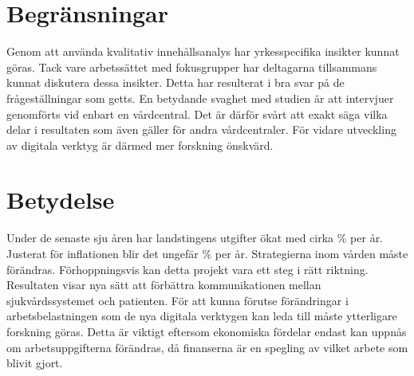 \documentclass[12pt,a4paper,oneside]{article}
\let\oldcite\cite
\renewcommand*\cite[1]{\textsuperscript{\oldcite{#1}}}
\begin{document}
\section*{Begr{\"a}nsningar}
Genom att anv{\"a}nda kvalitativ inneh{\aa}llsanalys har yrkesspecifika insikter kunnat g{\"o}ras. Tack vare arbetss{\"a}ttet med fokusgrupper har deltagarna tillsammans kunnat diskutera dessa insikter. Detta har resulterat i bra svar p{\aa} de fr{\aa}gest{\"a}llningar som getts. En betydande svaghet med studien {\"a}r att intervjuer genomf{\"o}rts vid enbart en v{\aa}rdcentral. Det {\"a}r d{\"a}rf{\"o}r sv{\aa}rt att exakt s{\"a}ga vilka delar i resultaten som {\"a}ven g{\"a}ller f{\"o}r andra v{\aa}rdcentraler. F{\"o}r vidare utveckling av digitala verktyg {\"a}r d{\"a}rmed mer forskning {\"o}nskv{\"a}rd.

\section*{Betydelse}
Under de senaste sju {\aa}ren har landstingens utgifter {\"o}kat med cirka {}\% per {\aa}r. Justerat f{\"o}r inflationen blir det ungef{\"a}r {}\% per {\aa}r\cite{numbers3.1, numbers3.2}. Strategierna inom v{\aa}rden m{\aa}ste f{\"o}r{\"a}ndras. F{\"o}rhoppningsvis kan detta projekt vara ett steg i r{\"a}tt riktning. Resultaten visar nya s{\"a}tt att f{\"o}rb{\"a}ttra kommunikationen mellan sjukv{\aa}rdssystemet och patienten.
F{\"o}r att kunna f{\"o}rutse f{\"o}r{\"a}ndringar i arbetsbelastningen som de nya digitala verktygen kan leda till m{\aa}ste ytterligare forskning g{\"o}ras.  Detta {\"a}r viktigt eftersom ekonomiska f{\"o}rdelar endast kan uppn{\aa}s om arbetsuppgifterna f{\"o}r{\"a}ndras, d{\aa} finanserna {\"a}r en spegling av vilket arbete som blivit gjort.

\end{document}
